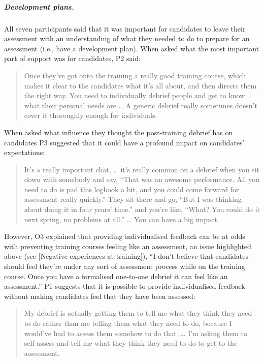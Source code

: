 \documentclass[a4paper,]{book}
\let\oldsubparagraph\subparagraph
\renewcommand{\subparagraph}[1]{\oldsubparagraph{#1}\mbox{}}
\begin{document}
\hypertarget{development-plans.}{%
\subparagraph{Development plans.}\label{development-plans.}}

All seven participants said that it was important for candidates to leave their assessment with an understanding of what they needed to do to prepare for an assessment (i.e., have a development plan). When asked what the most important part of support was for candidates, P2 said:

\begin{quote}
Once they've got onto the training a really good training course, which makes it clear to the candidates what it's all about, and then directs them the right way. You need to individually debrief people and get to know what their personal needs are \ldots{} A generic debrief really sometimes doesn't cover it thoroughly enough for individuals.
\end{quote}

When asked what influence they thought the post-training debrief has on candidates P3 suggested that it could have a profound impact on candidates' expectations:

\begin{quote}
It's a really important chat, \ldots{} it's really common on a debrief when you sit down with somebody and say, ``That was an awesome performance. All you need to do is pad this logbook a bit, and you could come forward for assessment really quickly.'' They sit there and go, ``But I was thinking about doing it in four years' time.'' and you're like, ``What? You could do it next spring, no problems at all.'' \ldots{} You can have a big impact.
\end{quote}

However, O3 explained that providing individualised feedback can be at odds with preventing training courses feeling like an assessment, an issue highlighted above (see {[}Negative experiences at training{]}), ``I don't believe that candidates should feel they're under any sort of assessment process while on the training course. Once you have a formalised one-to-one debrief it can feel like an assessment.'' P1 suggests that it is possible to provide individualised feedback without making candidates feel that they have been assessed:

\begin{quote}
My debrief is actually getting them to tell me what they think they need to do rather than me telling them what they need to do, because I would've had to assess them somehow to do that \ldots{}. I'm asking them to self-assess and tell me what they think they need to do to get to the assessment.
\end{quote}
\end{document}
